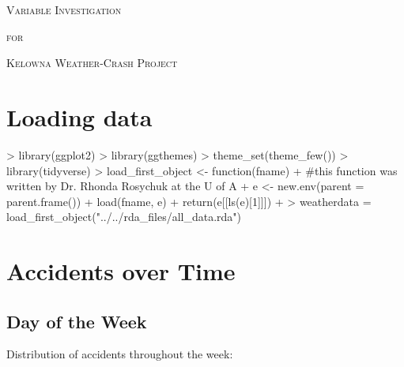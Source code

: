 \documentclass[11pt, a4paper]{article}
\begin{document}


\begin{center}
\Large{\textsc{Variable Investigation}}
\par
\normalsize{\textsc{for}}
\par
\large{\textsc{Kelowna Weather-Crash Project}}
\end{center}


\vspace{0.917 pc} %

\tableofcontents


\pagebreak
\section{Loading data}

\begin{Schunk}
\begin{Sinput}
> library(ggplot2)
> library(ggthemes)
> theme_set(theme_few())
> library(tidyverse)
> load_first_object <- function(fname){
+   #this function was written by Dr. Rhonda Rosychuk at the U of A 
+   e <- new.env(parent = parent.frame())
+   load(fname, e)
+   return(e[[ls(e)[1]]])
+ }
> weatherdata = load_first_object("../../rda_files/all_data.rda")
\end{Sinput}
\end{Schunk}



\section{Accidents over Time}

\subsection{Day of the Week} 

Distribution of accidents throughout the week:
\end{document}
